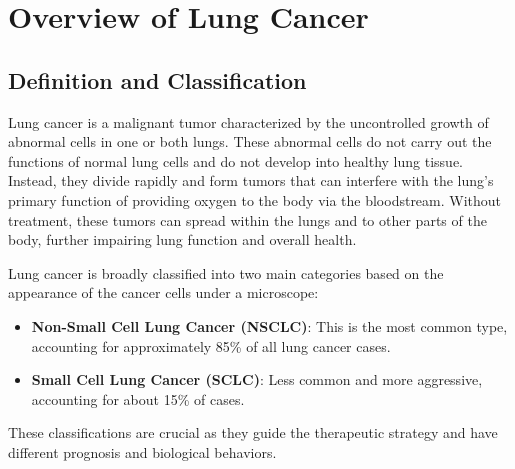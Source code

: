 \section{Overview of Lung Cancer}

\subsection{Definition and Classification}
Lung cancer is a malignant tumor characterized by the uncontrolled growth of abnormal cells in one 
or both lungs. These abnormal cells do not carry out the functions of normal lung cells and do not 
develop into healthy lung tissue. Instead, they divide rapidly and form tumors that can interfere 
with the lung’s primary function of providing oxygen to the body via the bloodstream. Without 
treatment, these tumors can spread within the lungs and to other parts of the body, further 
impairing lung function and overall health.

Lung cancer is broadly classified into two main categories based on the appearance of the cancer 
cells under a microscope:
\begin{itemize}
    \item \textbf{Non-Small Cell Lung Cancer (NSCLC)}: This is the most common type, accounting for 
    approximately 85\% of all lung cancer cases.

    \item \textbf{Small Cell Lung Cancer (SCLC)}: Less common and more aggressive, accounting for 
    about 15\% of cases.
\end{itemize}
These classifications are crucial as they guide the therapeutic strategy and have different 
prognosis and biological behaviors.

